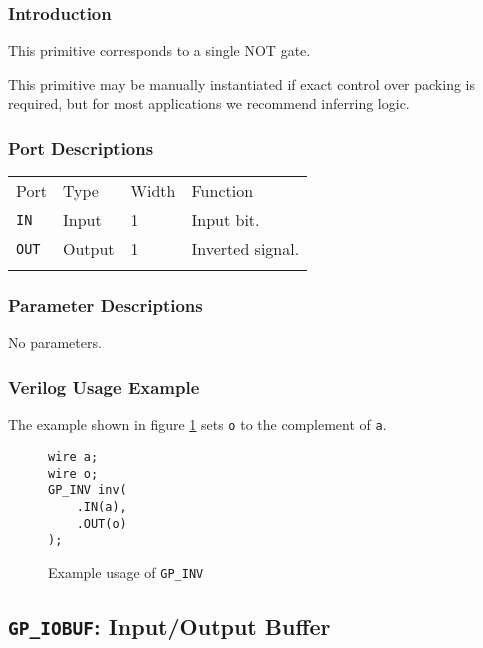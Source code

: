 \documentclass[11pt]{article}
\newcommand{\tokenstyle}[1]{\texttt{#1}}
\newcommand{\wirestyle}[1]{\texttt{#1}}
\newcommand{\whenstyle}[1]{{\fontseries{sb}\selectfont#1}}
\newcommand{\thinhline}{\Xhline{1\arrayrulewidth}}
\newcommand{\thickhline}{\Xhline{2.5\arrayrulewidth}}
\begin{document}
\subsubsection{Introduction}
This primitive corresponds to a single NOT gate.

This primitive may be manually instantiated if exact control over packing is required, but for most applications we
recommend inferring logic.

\subsubsection{Port Descriptions}

\begin{tabularx}{\textwidth}{lllX}
\thinhline
\whenstyle{Port} & \whenstyle{Type} & \whenstyle{Width} & \whenstyle{Function} \\
\thickhline
\tokenstyle{IN} & Input & 1 & Input bit. \\
\thinhline
\tokenstyle{OUT} & Output & 1 & Inverted signal. \\
\thinhline
\end{tabularx}

\subsubsection{Parameter Descriptions}

No parameters.

\subsubsection{Verilog Usage Example}

The example shown in figure \ref{gp-inv-example} sets \wirestyle{o} to the complement of \wirestyle{a}.

\begin{figure}[h]
\begin{lstlisting}
wire a;
wire o;
GP_INV inv(
	.IN(a),
	.OUT(o)
);
\end{lstlisting}
\caption{Example usage of \tokenstyle{GP\_INV}}
\label{gp-inv-example}
\end{figure}


\pagebreak
\subsection{\tokenstyle{GP\_IOBUF}: Input/Output Buffer}
\label{gp-iobuf}
\end{document}
